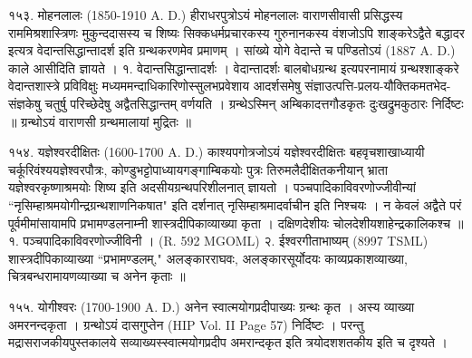१५३. मोहनलालः (1850-1910 A. D.)
हीराधरपुत्रोऽयं मोहनलालः वाराणसीवासी प्रसिद्धस्य राममिश्रशास्त्रिणः मुकुन्ददासस्य च शिष्यः सिक्कधर्मप्रचारकस्य गुरुनानकस्य वंशजोऽपि शाङ्करेऽद्वैते बद्धादर इत्यत्र वेदान्तसिद्धान्तादर्श इति ग्रन्थकरणमेव प्रमाणम् । सांख्ये योगे वेदान्ते च पण्डितोऽयं (1887 A. D.) काले आसीदिति ज्ञायते ।
१. वेदान्तसिद्धान्तादर्शः । वेदान्तादर्शः बालबोधग्रन्थ इत्यपरनामायं ग्रन्थश्शाङ्करे वेदान्तशास्त्रे प्रविविक्षुः मध्यममन्दाधिकारिणोस्सुलभप्रवेशाय आदर्शसमेषु संज्ञाउत्पत्ति-प्रलय-यौक्तिकमतभेद-संज्ञकेषु चतुर्षु परिच्छेदेषु अद्वैतसिद्धान्तम् वर्णयति । ग्रन्थेऽस्मिन् अम्बिकादत्तगौडकृतः दुःखद्रुमकुठारः निर्दिष्टः ॥ ग्रन्थोऽयं वाराणसी ग्रन्थमालायां मुद्रितः ॥

१५४. यज्ञेश्वरदीक्षितः (1600-1700 A. D.)
काश्यपगोत्रजोऽयं यज्ञेश्वरदीक्षितः बहवृचशाखाध्यायी चर्कूरिवंश्ययज्ञेश्वरपौत्रः, कोण्डुभट्टोपाध्यायगङ्गाम्बिकयोः पुत्रः तिरुमलैदीक्षितकनीयान् भ्राता यज्ञेश्वरकृष्णाश्रमयोः शिष्य इति अदसीयग्रन्थपरिशीलनात् ज्ञायतो । पञ्चपादिकाविवरणोज्जीवीन्यां ``नृसिम्हाश्रमयोगीन्द्रग्रन्थशाणनिकषात" इति दर्शनात् नृसिम्हाश्रमादर्वाचीन इति निश्चयः । न केवलं अद्वैते परं पूर्वमीमांसायामपि प्रभामण्डलनाम्नी शास्त्रदीपिकाव्याख्या कृता । दक्षिणदेशीयः चोलदेशीयशाहेन्द्रकालिकश्च ॥
१. पञ्चपादिकाविवरणोज्जीविनी । (R. 592 MGOML)
२. ईश्वरगीताभाष्यम् (8997 TSML)
शास्त्रदीपिकाव्याख्या ``प्रभामण्डलम्," अलङ्कारराघवः, अलङ्कारसूर्योदयः काव्यप्रकाशव्याख्या, चित्रबन्धरामायणव्याख्या च अनेन कृताः ॥

१५५. योगीश्वरः (1700-1900 A. D.)
अनेन स्वात्मयोगप्रदीपाख्यः ग्रन्थः कृत । अस्य व्याख्या अमरनन्दकृता । ग्रन्थोऽयं दासगुप्तेन (HIP Vol. II Page 57) निर्दिष्टः । परन्तु मद्रासराजकीयपुस्तकालये सव्याख्यस्स्वात्मयोगप्रदीप अमरान्दकृत इति त्रयोदशशतकीय इति च दृश्यते ।

